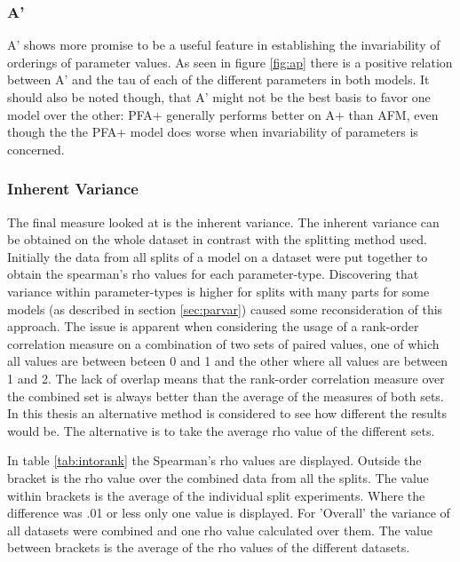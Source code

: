 \documentclass{scrartcl}
\begin{document}
\subsubsection{A'}
A' shows more promise to be a useful feature in establishing the invariability of orderings of parameter values. As seen in figure \ref{fig:ap} there is a positive relation between A' and the tau of each of the different parameters in both models. It should also be noted though, that A' might not be the best basis to favor one model over the other: PFA+ generally performs better on A+ than AFM, even though the the PFA+ model does worse when invariability of parameters is concerned.

\subsubsection{Inherent Variance}
The final measure looked at is the inherent variance. The inherent variance can be obtained on the whole dataset in contrast with the splitting method used. Initially the data from all splits of a model on a dataset were put together to obtain the spearman's rho values for each parameter-type. Discovering that variance within parameter-types is higher for splits with many parts for some models (as described in section \ref{sec:parvar}) caused some reconsideration of this approach. The issue is apparent when considering the usage of a rank-order correlation measure on a combination of two sets of paired values, one of which all values are between beteen 0 and 1 and the other where all values are between 1 and 2. The lack of overlap means that the rank-order correlation measure over the combined set is always better than the average of the measures of both sets. In this thesis an alternative method is considered to see how different the results would be. The alternative is to take the average rho value of the different sets.

In table \ref{tab:intorank} the Spearman's rho values are displayed. Outside the bracket is the rho value over the combined data from all the splits. The value within brackets is the average of the individual split experiments. Where the difference was .01 or less only one value is displayed. For 'Overall' the variance of all datasets were combined and one rho value calculated over them. The value between brackets is the average of the rho values of the different datasets.
\end{document}
